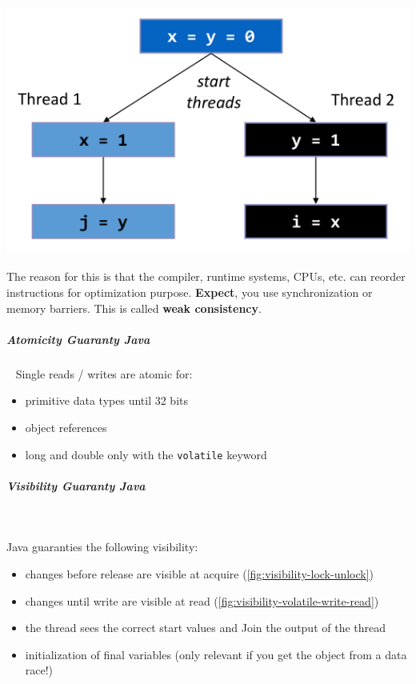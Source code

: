\documentclass[11pt,twoside,landscape]{article}
\begin{document}
\begin{multicols}{3}
{{{
\begin{center}
\includegraphics[width=.9\linewidth]{img/weak_consistency_example.png}
\end{center}
\label{fig:example-for-weak-consitency-example}
}

The reason for this is that the compiler, runtime systems, CPUs, etc. can reorder instructions for optimization purpose.
\textbf{Expect}, you use synchronization or memory barriers.
This is called \textbf{weak consistency}.

\subparagraph{Atomicity Guaranty Java} \
\label{sec:orga440ac5}
Single reads / writes are atomic for:
\begin{itemize}
\item primitive data types until 32 bits
\item object references
\item long and double only with the \texttt{volatile} keyword
\end{itemize}

\subparagraph{Visibility Guaranty Java} \
\label{sec:org095ef93}

Java guaranties the following visibility:
\begin{itemize}
\item changes before release are visible at acquire (\ref{fig:visibility-lock-unlock})
\item changes until write are visible at read (\ref{fig:visibility-volatile-write-read})
\item the thread sees the correct start values and Join the output of the thread
\item initialization of final variables (only relevant if you get the object from a data race!)
\end{itemize}


}}
\end{multicols}
\end{document}
